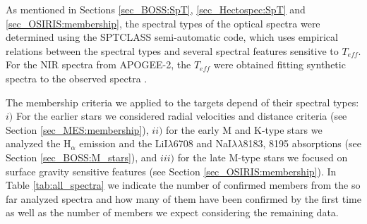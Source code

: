 \documentclass[12pt]{article}
\begin{document}
As mentioned in Sections \ref{sec_BOSS:SpT}, \ref{sec_Hectospec:SpT} and \ref{sec_OSIRIS:membership}, the spectral types of the optical spectra were determined using the SPTCLASS semi-automatic code, which uses empirical relations between the spectral types and several spectral features sensitive to $T_{eff}$. For the NIR spectra from APOGEE-2, the $T_{eff}$ were obtained fitting synthetic spectra to the observed spectra \citep{Kounkel2018}.

The membership criteria we applied to the targets depend of their spectral types: $i)$ For the earlier stars we considered radial velocities and distance criteria (see Section \ref{sec_MES:membership}), $ii)$ for the early M and K-type stars we analyzed the H$_\alpha$ emission and the LiI$\lambda$6708 and NaI$\lambda\lambda$8183, 8195 absorptions (see Section \ref{sec_BOSS:M_stars}), and $iii)$ for the late M-type stars we focused on surface gravity sensitive features (see Section \ref{sec_OSIRIS:membership}). In Table \ref{tab:all_spectra} we indicate the number of confirmed members from the so far analyzed spectra and how many of them have been confirmed by the first time as well as the number of members we expect considering the remaining data.
\end{document}
